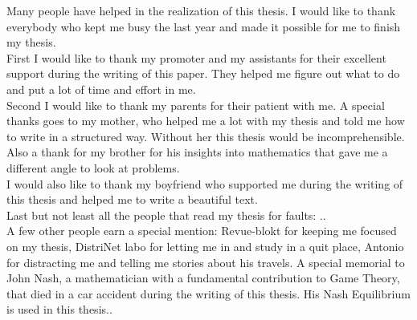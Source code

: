 \documentclass[master=cws, masteroption=vs]{kulemt}
\begin{document}
\begin{preface}
 Many people have helped in the realization of this thesis. 
  I would like to thank everybody who kept me busy the last year and made it possible for me to finish my thesis.\\
  
  First I would like to thank my promoter and my assistants for their excellent support during the writing of this paper. They helped me figure out what to do and put a lot of time and effort in me.\\
  
   Second I would like to thank my parents for their patient with me. A special thanks goes to my mother, who helped me a lot with my thesis and told me how to write in a structured way. Without her this thesis would be incomprehensible. Also a thank for my brother for his insights into mathematics that gave me a different angle to look at problems.\\
   
   I would also like to thank my boyfriend who supported me during the writing of this thesis and helped me to write a beautiful text.  \\
   
   Last but not least all the people that read my thesis for faults: .. \\
   A few other people earn a special mention: Revue-blokt for keeping me focused on my thesis, DistriNet labo for letting me in and study in a quit place, Antonio for distracting me and telling me stories about his travels.
   A special memorial to John Nash, a mathematician with a fundamental contribution to Game Theory, that died in a car accident during the writing of this thesis. His Nash Equilibrium is used in this thesis.. \\
 
\end{preface}
\end{document}
